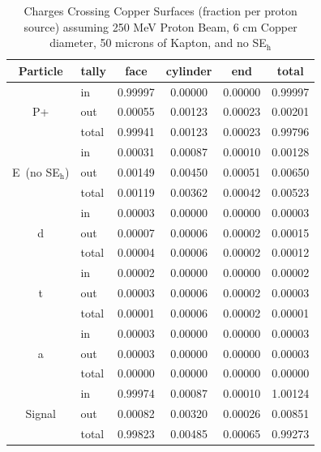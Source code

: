 \documentclass{mc2015}
\begin{document}
\begin{table}
  \centering
  \caption{Charges Crossing Copper Surfaces (fraction per proton source) assuming 250 MeV Proton Beam, 6 cm Copper diameter, 50 microns of Kapton, and no SE$_\text{h}$}
  \begin{tabular}{clcccc}
    \toprule
    Particle & tally & face & cylinder & end & total \\
    \midrule
       & in & \num{0.99997} & \num{0.00000} & \num{0.00000} & \num{0.99997} \\
    P+ & out & \num{0.00055} & \num{0.00123} & \num{0.00023} & \num{0.00201} \\
       & total & \num{0.99941} & \num{0.00123} & \num{0.00023} & \num{0.99796} \\
    \midrule
       & in & \num{0.00031} & \num{0.00087} & \num{0.00010} & \num{0.00128} \\
    E\ (no SE$_\text{h}$) & out & \num{0.00149} & \num{0.00450} & \num{0.00051} & \num{0.00650} \\
       & total & \num{0.00119} & \num{0.00362} & \num{0.00042} & \num{0.00523} \\
    \midrule
       & in & \num{0.00003} & \num{0.00000} & \num{0.00000} & \num{0.00003} \\
     d & out & \num{0.00007} & \num{0.00006} & \num{0.00002} & \num{0.00015} \\
       & total & \num{0.00004} & \num{0.00006} & \num{0.00002} & \num{0.00012} \\
    \midrule
       & in & \num{0.00002} & \num{0.00000} & \num{0.00000} & \num{0.00002} \\
     t & out & \num{0.00003} & \num{0.00006} & \num{0.00002} & \num{0.00003} \\
       & total & \num{0.00001} & \num{0.00006} & \num{0.00002} & \num{0.00001} \\
    \midrule
       & in & \num{0.00003} & \num{0.00000} & \num{0.00000} & \num{0.00003} \\
     a & out & \num{0.00003} & \num{0.00000} & \num{0.00000} & \num{0.00003} \\
       & total & \num{0.00000} & \num{0.00000} & \num{0.00000} & \num{0.00000} \\
    \midrule
       & in & \num{0.99974} & \num{0.00087} & \num{0.00010} & \num{1.00124} \\
    Signal & out & \num{0.00082} & \num{0.00320} & \num{0.00026} & \num{0.00851} \\
       & total & \num{0.99823} & \num{0.00485} & \num{0.00065} & \num{0.99273} \\
    \bottomrule
  \end{tabular}
  \label{tab:mcnp_charge_crossing}
\end{table}
\end{document}
